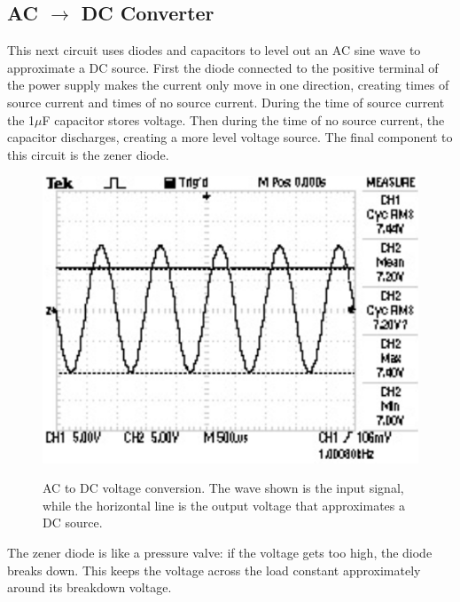 \documentclass[twocolumn,english]{IEEEtran}
\begin{document}
\noindent\hrulefill
\subsection{\textbf{AC $\rightarrow$ DC Converter}}
This next circuit uses diodes and capacitors to level out an AC sine wave to approximate a DC source. First the diode connected to the positive terminal of the power supply makes the current only move in one direction, creating times of source current and times of no source current. During the time of source current the 1$\mu$F capacitor stores voltage. Then during the time of no source current, the capacitor discharges, creating a more level voltage source. The final component to this circuit is the zener diode.


\begin{figure}[h!]
  \begin{centering}
  \begin{center}
  \includegraphics[width=\linewidth]{./Images/dcp.png}
  \label{fig:dcp}
  \caption{AC to DC voltage conversion. The wave shown is the input signal, while the horizontal line is the output voltage that approximates a DC source.}
  \end{center}
  \par\end{centering}
  \end{figure}
The zener diode is like a pressure valve: if the voltage gets too high, the diode breaks down. This keeps the voltage across the load constant approximately around its breakdown voltage.
\end{document}
